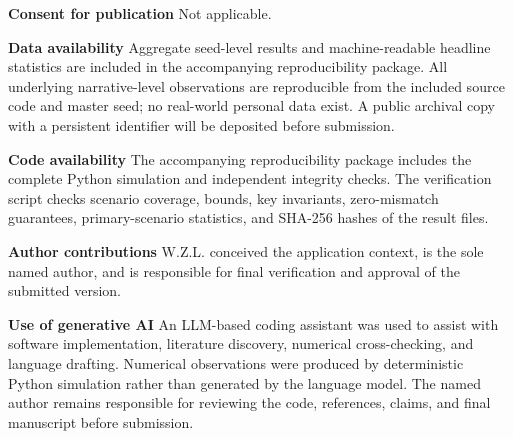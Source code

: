 \documentclass[pdflatex,sn-mathphys-num]{sn-jnl}
\theoremstyle{plain}
\begin{document}
\textbf{Consent for publication} Not applicable.

\textbf{Data availability} Aggregate seed-level results and machine-readable headline statistics are included in the accompanying reproducibility package. All underlying narrative-level observations are reproducible from the included source code and master seed; no real-world personal data exist. A public archival copy with a persistent identifier will be deposited before submission.

\textbf{Code availability} The accompanying reproducibility package includes the complete Python simulation and independent integrity checks. The verification script checks scenario coverage, bounds, key invariants, zero-mismatch guarantees, primary-scenario statistics, and SHA-256 hashes of the result files.

\textbf{Author contributions} W.Z.L. conceived the application context, is the sole named author, and is responsible for final verification and approval of the submitted version.

\textbf{Use of generative AI} An LLM-based coding assistant was used to assist with software implementation, literature discovery, numerical cross-checking, and language drafting. Numerical observations were produced by deterministic Python simulation rather than generated by the language model. The named author remains responsible for reviewing the code, references, claims, and final manuscript before submission.
\end{document}

